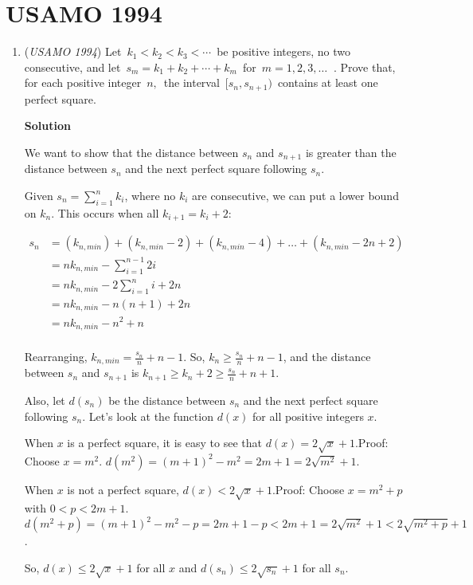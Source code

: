 \section{USAMO 1994}
        \begin{enumerate}
        	\item (\textit{USAMO 1994}) Let $\, k_1 < k_2 < k_3 < \cdots \,$ be positive integers, no two consecutive, and let $\, s_m = k_1 + k_2 + \cdots + k_m \,$ for $\, m = 1,2,3, \ldots \; \;$.  Prove that, for each positive integer $\, n, \,$ the interval $\, [s_n, s_{n + 1}) \,$ contains at least one perfect square.


 



\textbf{Solution}

We want to show that the distance between $s_n$ and $s_{n+1}$ is greater than the distance between $s_n$ and the next perfect square following $s_n$.

 Given $s_n=\sum_{i=1}^{n}k_i$, where no $k_i$ are consecutive, we can put a lower bound on $k_n$. This occurs when all $k_{i+1}=k_i+2$:

 
 \begin{align*} s_n&=(k_{n,min})+(k_{n,min}-2)+(k_{n,min}-4)+\dots+(k_{n,min}-2n+2)\\ &=nk_{n,min}-\sum_{i=1}^{n-1}2i\\ &=nk_{n,min}-2\sum_{i=1}^{n}i+2n\\ &=nk_{n,min}-n(n+1)+2n\\ &=nk_{n,min}-n^2+n\\ \end{align*}


 Rearranging, $k_{n,min}=\frac{s_n}{n}+n-1$. So, $k_n\geq\frac{s_n}{n}+n-1$, and the distance between $s_n$ and $s_{n+1}$ is $k_{n+1}\geq k_n+2\geq\frac{s_n}{n}+n+1$.

 Also, let $d(s_n)$ be the distance between $s_n$ and the next perfect square following $s_n$. Let's look at the function $d(x)$ for all positive integers $x$.

 When $x$ is a perfect square, it is easy to see that $d(x)=2\sqrt{x}+1$.Proof: Choose $x=m^2$. $d(m^2)=(m+1)^2-m^2=2m+1=2\sqrt{m^2}+1$.

 When $x$ is not a perfect square, $d(x)<2\sqrt{x}+1$.Proof: Choose $x=m^2+p$ with $0<p<2m+1$. $d(m^2+p)=(m+1)^2-m^2-p=2m+1-p<2m+1=2\sqrt{m^2}+1<2\sqrt{m^2+p}+1$.

 So, $d(x)\leq 2\sqrt{x}+1$ for all $x$ and $d(s_n)\leq 2\sqrt{s_n}+1$ for all $s_n$.


\end{enumerate}
